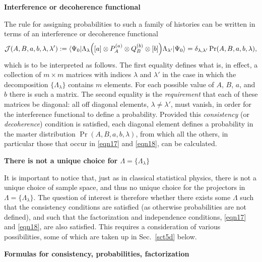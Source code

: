 \documentclass[10pt]{article} %
\def\outl#1{\par{\medskip\noindent\hspace*{.5cm}\bf
      \mathversion{bold}#1\mathversion{normal}\smallskip} }
\def\np{} \def\xa{} \def\xb{} \def\xn{} \def\xp{}
\def\outl#1{} \def\np{} \def\xa{} \def\xb{} \def\xn{} \def\xp{}
\def\outl#1{\par{\medskip\noindent\hspace*{.5cm}\bf
      \mathversion{bold}#1\mathversion{normal}\smallskip} }
\def\np{\newpage }\def\xn{\nopagebreak }\def\xp{\pagebreak }
\newcommand{\Blp}{\Bigl(}
\newcommand{\Brp}{\Bigr)}
\newcommand{\lgl}{\langle }
\newcommand{\mte}[2]{\lgl#1|#2|#1\rgl }
\newcommand{\ot}{\otimes }
\newcommand{\rgl}{\rangle }
\newcommand{\tm}{\times }
\newcommand{\JM}{{\mathcal J}}
\newcommand{\dl}{\delta }
\newcommand{\lm}{\lambda }
\newcommand{\Lm}{\Lambda }
\begin{document}
\xb
\outl{Interference or decoherence functional }
\xa


The rule for assigning probabilities to such a family of histories can be
written in terms of an interference or decoherence functional \cite{GMHr93}
\begin{equation}
  \JM(A,B,a,b,\lm,\lm') := 
 \mte{\Psi_0}{\Lm_\lm \Blp [a]\ot P^{(a)}_A\ot Q^{(b)}_B  \ot[b]  
 \Brp \Lm_{\lm'}} =
 \dl_{\lm,\lm'} \Pr(A,B,a,b,\lm),
\label{eqn35}
\end{equation}
which is to be interpreted as follows. The first equality defines what is, in
effect, a collection of $m\tm m$ matrices with indices $\lm$ and $\lm'$ in the
case in which the decomposition $\{\Lm_\lm\}$ contains $m$ elements.  For each
possible value of $A$, $B$, $a$, and $b$ there is such a matrix. The second
equality is the \emph{requirement} that each of these matrices be diagonal:
all off diagonal elements, $\lm\neq \lm'$, must vanish, in order for the
interference functional to define a probability.  Provided this
\emph{consistency} (or \emph{decoherence}) condition is satisfied, each
diagonal element defines a probability in the master distribution
$\Pr(A,B,a,b,\lm)$, from which all the others, in particular those that occur
in \eqref{eqn17} and \eqref{eqn18}, can be calculated.


\xb
\outl{There is not a unique choice for $\Lm=\{\Lm_\lm\}$}
\xa



It is important to notice that, just as in classical statistical physics,
there is not a unique choice of sample space, and thus no unique choice for
the projectors in $\Lm=\{\Lm_\lm\}$. The question of interest is therefore
whether there exists some $\Lm$ such that the consistency conditions are
satisfied (as otherwise probabilities are not defined), and such that the
factorization and independence conditions, \eqref{eqn17} and \eqref{eqn18},
are also satisfied.  This requires a consideration of various possibilities,
some of which are taken up in Sec.~\ref{sct5d} below.

\xb
\outl{Formulas for consistency, probabilities, factorization}
\xa
\end{document}
